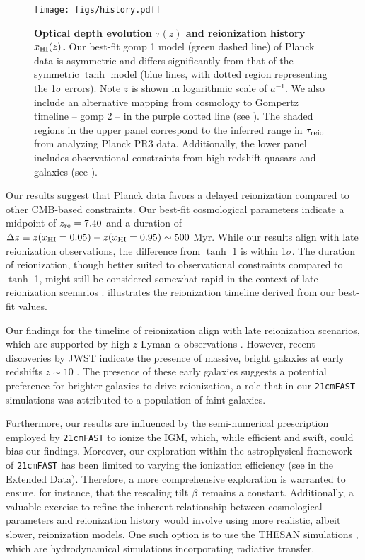 \begin{figure}[tb]
\centering
\texttt{[image: figs/history.pdf]}
\caption{\textbf{Optical depth evolution $\tau(z)$ and reionization
history $x_{\mathrm{HI}}(z)$.}
Our best-fit gomp 1 model (green dashed line) of Planck data is
asymmetric and differs significantly from that of the symmetric $\tanh$
model (blue lines, with dotted region representing the 1$\sigma$
errors). Note $z$ is shown in logarithmic scale of $a^{-1}$.
We also include an alternative mapping from cosmology to Gompertz
timeline -- gomp 2 -- in the purple dotted line (see ).
The shaded regions in the upper panel correspond to the inferred range
in $\tau_{\mathrm{reio}}$ from analyzing Planck PR3 data.
Additionally, the lower panel includes observational constraints from
high-redshift quasars and galaxies (see ). 
}
\label{fig:history}
\end{figure}

Our results suggest that Planck data favors a delayed reionization
compared to other CMB-based constraints.
Our best-fit cosmological parameters indicate a midpoint of $z_{\mathrm{re}} =
7.40$ and a duration of $\Delta z \equiv z(x_{\mathrm{HI}} = 0.05) - z(x_{\mathrm{HI}} =
0.95) \sim 500 $ Myr.
While our results align with late reionization observations, the
difference from $\tanh$ 1 is within 1$\sigma$.
The duration of reionization, though better suited to observational
constraints compared to  $\tanh$ 1, might still be considered
somewhat rapid in the context of late reionization scenarios
\cite{Cain2021}.
 illustrates the reionization timeline derived
from our best-fit values.

Our findings for the timeline of reionization align with late
reionization scenarios, which are supported by high-$z$ Lyman-$\alpha$
observations \cite{Keating2020, Cain2021}.
However, recent discoveries by JWST indicate the presence of massive,
bright galaxies at early redshifts $z \sim 10$
\cite{Adams2023, Bradley2023, Donnan2023}.
The presence of these early galaxies suggests a potential preference for
brighter galaxies to drive reionization, a role that in our
\texttt{21cmFAST} simulations was attributed to a population of faint
galaxies.

Furthermore, our results are influenced by the semi-numerical
prescription employed by \texttt{21cmFAST} to ionize the IGM, which,
while efficient and swift, could bias our findings.
Moreover, our exploration within the astrophysical framework of
\texttt{21cmFAST} has been limited to varying the ionization efficiency
(see  in the Extended Data).
Therefore, a more comprehensive exploration is warranted to ensure, for
instance, that the rescaling tilt $\beta$ remains a constant.
Additionally, a valuable exercise to refine the inherent relationship
between cosmological parameters and reionization history would involve
using more realistic, albeit slower, reionization models.
One such option is to use the THESAN simulations \cite{Kannan2022},
which are hydrodynamical simulations incorporating radiative transfer.
